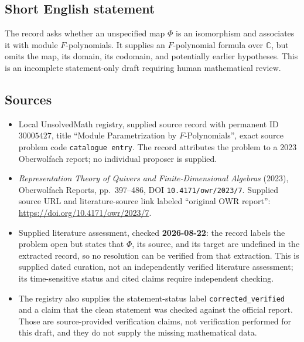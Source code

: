 \documentclass[11pt]{article}
\newcommand{\C}{\mathbb{C}}
\begin{document}
\subsection{Short English statement}
The record asks whether an unspecified map \(\Phi\) is an isomorphism and associates it with module \(F\)-polynomials. It supplies an \(F\)-polynomial formula over \(\C\), but omits the map, its domain, its codomain, and potentially earlier hypotheses. This is an incomplete statement-only draft requiring human mathematical review.
\subsection{Sources}
\begin{itemize}
\item Local UnsolvedMath registry, supplied source record with permanent ID \(30005427\), title ``Module Parametrization by \(F\)-Polynomials'', exact source problem code \texttt{catalogue entry}. The record attributes the problem to a 2023 Oberwolfach report; no individual proposer is supplied.
\item \emph{Representation Theory of Quivers and Finite-Dimensional Algebras} (2023), Oberwolfach Reports, pp.~397--486, DOI \texttt{10.4171/owr/2023/7}. Supplied source URL and literature-source link labeled ``original OWR report'': \url{https://doi.org/10.4171/owr/2023/7}.
\item Supplied literature assessment, checked \textbf{2026-08-22}: the record labels the problem open but states that \(\Phi\), its source, and its target are undefined in the extracted record, so no resolution can be verified from that extraction. This is supplied dated curation, not an independently verified literature assessment; its time-sensitive status and cited claims require independent checking.
\item The registry also supplies the statement-status label \texttt{corrected\_verified} and a claim that the clean statement was checked against the official report. Those are source-provided verification claims, not verification performed for this draft, and they do not supply the missing mathematical data.
\end{itemize}
\end{document}
